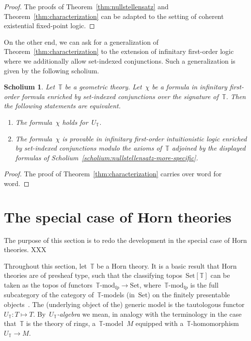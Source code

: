\documentclass[oneside,reqno]{amsart}
\theoremstyle{definition}
\theoremstyle{plain}
\newtheorem{scholium}[defn]{Scholium}
\theoremstyle{remark}
\newcommand{\TT}{\mathbb{T}}
\newcommand{\Set}{\mathrm{Set}}
\renewcommand{\_}{\mathpunct{.}\,}
\newcommand{\?}{\,{:}\,}
\newcommand{\Mod}[1]{{#1}\mathrm{\text{-}mod}}
\begin{document}
\begin{proof}The proofs of Theorem~\ref{thm:nullstellensatz} and
Theorem~\ref{thm:characterization} can be adapted to the setting of coherent
existential fixed-point logic.
\end{proof}

On the other end, we can ask for a generalization of
Theorem~\ref{thm:characterization} to the extension of infinitary first-order
logic where we additionally allow set-indexed conjunctions. Such a
generalization is given by the following scholium.

\begin{scholium}
Let~$\TT$ be a geometric theory. Let~$\chi$ be a formula in infinitary
first-order formula enriched by set-indexed conjunctions over the signature
of~$\TT$. Then the following statements are equivalent.
\begin{enumerate}
\item The formula~$\chi$ holds for~$U_\TT$. \smallskip
\item The formula~$\chi$ is provable in infinitary first-order intuitionistic
logic enriched by set-indexed conjunctions modulo the axioms of~$\TT$ adjoined
by the displayed formulas of
Scholium~\ref{scholium:nullstellensatz-more-specific}.
\end{enumerate}
\end{scholium}

\begin{proof}The proof of Theorem~\ref{thm:characterization} carries over word
for word.
\end{proof}


\section{The special case of Horn theories}
\label{sect:horn}

The purpose of this section is to redo the development in the special case of
Horn theories. XXX

Throughout this section, let~$\TT$ be a Horn theory. It is a basic result that
Horn theories are of presheaf type, such that the classifying topos~$\Set[\TT]$
can be taken as the topos of functors~$\Mod{\TT}_\mathrm{fp} \to \Set$,
where~$\Mod{\TT}_\mathrm{fp}$ is the full subcategory of the category
of~$\TT$-models (in~$\Set$) on the finitely presentable objects~\cite[Theorem~2.1.21]{caramello:tst}. The
(underlying object of the) generic model is the tautologous functor~$U_\TT : T
\mapsto T$. By~\emph{$U_\TT$-algebra} we mean, in analogy with the terminology in
the case that~$\TT$ is the theory of rings, a~$\TT$-model~$M$ equipped with
a~$\TT$-homomorphism~$U_\TT \to M$.
\end{document}
